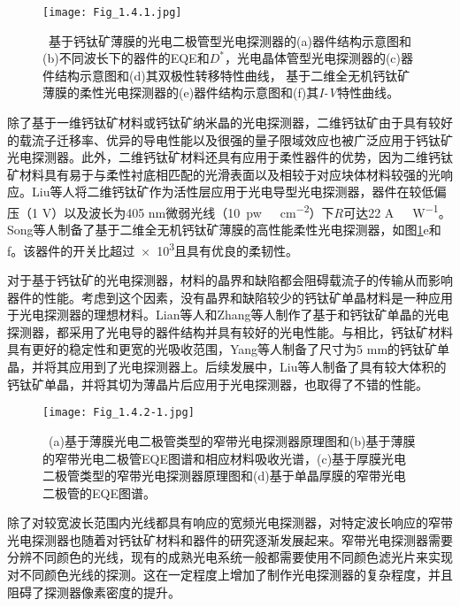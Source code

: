 \documentclass[forlib]{WHUMaster}   %
\begin{document}
{\begin{figure}[ht]
\centering
  \texttt{[image: Fig\_1.4.1.jpg]}
  \caption{\rm \ 基于钙钛矿薄膜的光电二极管型光电探测器的(a)器件结构示意图和(b)不同波长下的器件的EQE和$D^*$\cite{RN129}，光电晶体管型光电探测器的(c)器件结构示意图和(d)其双极性转移特性曲线\cite{RN139}， 基于二维全无机钙钛矿薄膜的柔性光电探测器的(e)器件结构示意图和(f)其\emph{I-V}特性曲线\cite{RN146}。}
  \label{fig:1.4.1}
\end{figure}

除了基于一维钙钛矿材料或钙钛矿纳米晶的光电探测器，二维钙钛矿由于具有较好的载流子迁移率、优异的导电性能以及很强的量子限域效应也被广泛应用于钙钛矿光电探测器。此外，二维钙钛矿材料还具有应用于柔性器件的优势，因为二维钙钛矿材料具有易于与柔性衬底相匹配的光滑表面以及相较于对应块体材料较强的光响应。Liu等人将二维钙钛矿作为活性层应用于光电导型光电探测器，器件在较低偏压（1 V）以及波长为405 nm微弱光线（10\ \si{pw\ cm^{-2}}）下$R$可达22 \si{A\ W^{-1}}\cite{RN145}。Song等人制备了基于二维全无机钙钛矿薄膜的高性能柔性光电探测器，如图\ref{fig:1.4.1}e和f\cite{RN146}。该器件的开关比超过\num{e3}且具有优良的柔韧性。

对于基于钙钛矿的光电探测器，材料的晶界和缺陷都会阻碍载流子的传输从而影响器件的性能。考虑到这个因素，没有晶界和缺陷较少的钙钛矿单晶材料是一种应用于光电探测器的理想材料。Lian等人和Zhang等人制作了基于和钙钛矿单晶的光电探测器，都采用了光电导的器件结构并具有较好的光电性能\cite{RN147,RN148}。与相比，钙钛矿材料具有更好的稳定性和更宽的光吸收范围，Yang等人制备了尺寸为5 mm的钙钛矿单晶，并将其应用到了光电探测器上\cite{RN150}。后续发展中，Liu等人制备了具有较大体积的钙钛矿单晶，并将其切为薄晶片后应用于光电探测器，也取得了不错的性能\cite{RN151}。

\begin{figure}[htb]
\centering
  \texttt{[image: Fig\_1.4.2-1.jpg]}
  \caption{\rm \ (a)基于薄膜光电二极管类型的窄带光电探测器原理图\cite{RN152}和(b)基于薄膜的窄带光电二极管EQE图谱和相应材料吸收光谱\cite{RN153}，(c)基于厚膜光电二极管类型的窄带光电探测器原理图\cite{RN152}和(d)基于单晶厚膜的窄带光电二极管的EQE图谱\cite{RN130}。}
  \label{fig:1.4.2}
\end{figure}

除了对较宽波长范围内光线都具有响应的宽频光电探测器，对特定波长响应的窄带光电探测器也随着对钙钛矿材料和器件的研究逐渐发展起来。窄带光电探测器需要分辨不同颜色的光线，现有的成熟光电系统一般都需要使用不同颜色滤光片来实现对不同颜色光线的探测。这在一定程度上增加了制作光电探测器的复杂程度，并且阻碍了探测器像素密度的提升。

}
\end{document}
